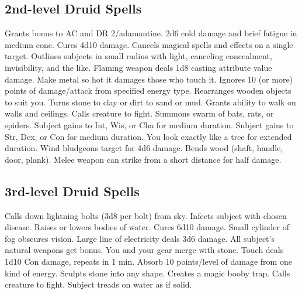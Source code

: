 \subsection{2nd-level Druid Spells}
\begin{spelllist}
 Grants  bonus to AC and DR 2/adamantine.
 2d6 cold damage and brief fatigue in medium cone.
 Cures 4d10 damage.
 Cancels magical spells and effects on a single target.
 Outlines subjects in small radius with light, canceling concealment, invisibility, and the like.
 Flaming weapon deals 1d8 \add casting attribute value damage.
 Make metal so hot it damages those who touch it.
 Ignores 10 (or more) points of damage/attack from specified energy type.
 Rearranges wooden objects to suit you.
 Turns stone to clay or dirt to sand or mud.
 Grants ability to walk on walls and ceilings.
 Calls creature to fight.
 Summons swarm of bats, rats, or spiders.
 Subject gains  to Int, Wis, or Cha for medium duration.
 Subject gains  to Str, Dex, or Con for medium duration.
 You look exactly like a tree for extended duration.
 Wind bludgeons target for 4d6 damage.
 Bends wood (shaft, handle, door, plank).
 Melee weapon can strike from a short distance for half damage.
\end{spelllist}

\subsection{3rd-level Druid Spells}
\begin{spelllist}
 Calls down lightning bolts (3d8 per bolt) from sky.
 Infects subject with chosen disease.
 Raises or lowers bodies of water.
 Cures 6d10 damage.
 Small cylinder of fog obscures vision.
 Large line of electricity deals 3d6 damage.
 All subject's natural weapons get  bonus.
 You and your gear merge with stone.
 Touch deals 1d10 Con damage, repeats in 1 min.
 Absorb 10 points/level of damage from one kind of energy.
 Sculpts stone into any shape.
 Creates a magic booby trap.
 Calls creature to fight.
 Subject treads on water as if solid.
\end{spelllist}

